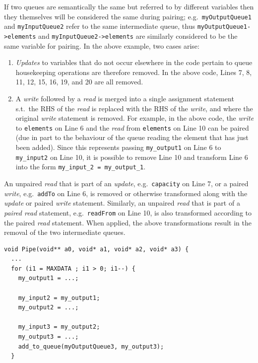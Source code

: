 %
If two queues are semantically the same but referred to by different variables then they themselves will be considered the same during pairing; e.g.\ \lstinline|myOutputQueue1| and \lstinline|myInputQueue2| refer to the same intermediate queue, thus \lstinline|myOutputQueue1->elements| and \lstinline|myInputQueue2->elements| are similarly considered to be the same variable for pairing.
%
In the above example, two cases arise:
%
\begin{enumerate}
\item \emph{Updates} to variables that do not occur elsewhere in the code pertain to queue housekeeping operations are therefore removed.
%
In the above code, Lines 7, 8, 11, 12, 15, 16, 19, and 20 are all removed.


\item A \emph{write} followed by a \emph{read} is merged into a single assignment statement s.t.\ the RHS of the \emph{read} is replaced with the RHS of the \emph{write}, and where the original \emph{write} statement is removed.
%
For example, in the above code, the \emph{write} to \lstinline|elements| on Line 6 and the \emph{read} from \lstinline|elements| on Line 10 can be paired (due in part to the behaviour of the queue reading the element that has just been added). Since this represents passing \lstinline|my_output1| on Line 6 to \lstinline|my_input2| on Line 10, it is possible to remove Line 10 and transform Line 6 into the form \lstinline|my_input_2 = my_output_1|.
%
\end{enumerate}
%
An unpaired \emph{read} that is part of an \emph{update}, e.g.\ \lstinline|capacity| on Line 7, or a paired \emph{write}, e.g.\ \lstinline|addTo| on Line 6, is removed or otherwise transformed along with the \emph{update} or paired \emph{write} statement. Similarly, an unpaired \emph{read} that is part of a \emph{paired read} statement, e.g.\ \lstinline|readFrom| on Line 10, is also transformed according to the paired \emph{read} statement.
%
%
When applied, the above transformations result in the removal of the two intermediate queues.
%
\begin{lstlisting}[frame=single]
void Pipe(void** a0, void* a1, void* a2, void* a3) {
  ...
  for (i1 = MAXDATA ; i1 > 0; i1--) {
    my_output1 = ...;

    my_input2 = my_output1;
    my_output2 = ...;

    my_input3 = my_output2;
    my_output3 = ...;
    add_to_queue(myOutputQueue3, my_output3);
  }
\end{lstlisting}

